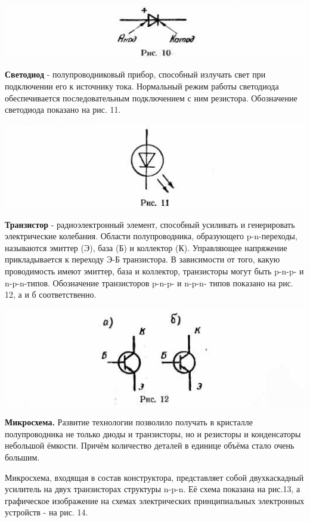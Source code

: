 \documentclass[12pt]{article}
\begin{document}
\includegraphics[scale=0.8]{ekon3_011_1}

\textbf{Светодиод} - полупроводниковый прибор, способный излучать свет при подключении его к источнику тока. Нормальный режим работы светодиода обеспечивается последовательным подключением с ним резистора. Обозначение светодиода показано на рис. 11.

\includegraphics[scale=0.8]{ekon3_011_2}

\textbf{Транзистор} - радиоэлектронный элемент, способный усиливать и генерировать электрические колебания. Области полупроводника, образующего p-n-переходы, называются эмиттер (Э), база (Б) и коллектор (К). Управляющее напряжение прикладывается к переходу Э-Б транзистора. В зависимости от того, какую проводимость имеют эмиттер, база и коллектор, транзисторы могут быть p-n-p- и n-p-n-типов. Обозначение транзисторов p-n-p- и n-p-n- типов показано на рис. 12, а и б соответственно.

\includegraphics[scale=0.8]{ekon3_011_3}

\newpage

\textbf{Микросхема.} Развитие технологии позволило получать в кристалле полупроводника не только диоды и транзисторы, но и резисторы и конденсаторы небольшой ёмкости. Причём количество деталей в единице объёма стало очень большим.

Микросхема, входящая в состав конструктора, представляет собой двухкаскадный усилитель на двух транзисторах структуры n-p-n. Её схема показана на рис.13, а графическое изображение на схемах электрических принципиальных электронных устройств - на рис. 14.
\end{document}
